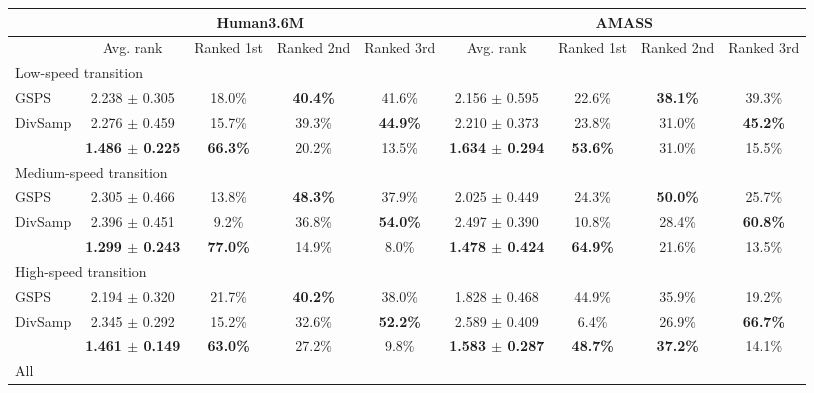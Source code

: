 \documentclass[10pt,twocolumn,letterpaper]{article}
\begin{document}
\setlength{\tabcolsep}{4pt}
\begin{table*}[t!]\renewcommand{\arraystretch}{0.9}
    \footnotesize
    \centering
    \begin{tabular}{l@{\hskip 8mm}cccc@{\hskip 8mm}cccc}
        \toprule
        & \multicolumn{4}{c}{Human3.6M\cite{ionescu2013h36m}} & \multicolumn{4}{c}{AMASS\cite{mahmood2019amass}} \\
        \midrule
        & Avg. rank & Ranked 1st & Ranked 2nd & Ranked 3rd & Avg. rank & Ranked 1st & Ranked 2nd & Ranked 3rd \\
        \midrule
        \multicolumn{9}{l}{Low-speed transition} \\
        \midrule
        GSPS & 2.238 $\pm$ 0.305 & 18.0\% & \textbf{40.4\%} & 41.6\% & 2.156 $\pm$ 0.595 & 22.6\% & \textbf{38.1\%} & 39.3\%\\
        DivSamp & 2.276 $\pm$ 0.459 & 15.7\% & 39.3\% & \textbf{44.9\%} & 2.210 $\pm$ 0.373 & 23.8\% & 31.0\% & \textbf{45.2\%}\\
        \modelname{} & \textbf{1.486 $\pm$ 0.225} & \textbf{66.3\%} & 20.2\% & 13.5\% & \textbf{1.634 $\pm$ 0.294} & \textbf{53.6\%} & 31.0\% & 15.5\%\\
        \midrule
        \multicolumn{9}{l}{Medium-speed transition} \\
        \midrule
        GSPS & 2.305 $\pm$ 0.466 & 13.8\% & \textbf{48.3\%} & 37.9\% & 2.025 $\pm$ 0.449 & 24.3\% & \textbf{50.0\%} & 25.7\%\\
        DivSamp & 2.396 $\pm$ 0.451 & 9.2\% & 36.8\% & \textbf{54.0\%} & 2.497 $\pm$ 0.390 & 10.8\% & 28.4\% & \textbf{60.8\%}\\
        \modelname{} & \textbf{1.299 $\pm$ 0.243} & \textbf{77.0\%} & 14.9\% & 8.0\% & \textbf{1.478 $\pm$ 0.424} & \textbf{64.9\%} & 21.6\% & 13.5\%\\
        \midrule
        \multicolumn{9}{l}{High-speed transition} \\
        \midrule
        GSPS & 2.194 $\pm$ 0.320 & 21.7\% & \textbf{40.2\%} & 38.0\% & 1.828 $\pm$ 0.468 & 44.9\% & 35.9\% & 19.2\%\\
        DivSamp & 2.345 $\pm$ 0.292 & 15.2\% & 32.6\% & \textbf{52.2\%} & 2.589 $\pm$ 0.409 & 6.4\% & 26.9\% & \textbf{66.7\%}\\
        \modelname{} & \textbf{1.461 $\pm$ 0.149} & \textbf{63.0\%} & 27.2\% & 9.8\% & \textbf{1.583 $\pm$ 0.287} & \textbf{48.7\%} & \textbf{37.2\%} & 14.1\%\\
        \midrule
        \multicolumn{9}{l}{All} \\

\end{tabular}
\end{table*}
\end{document}
